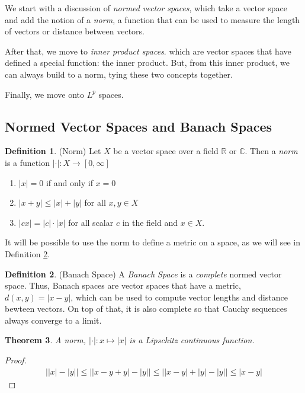 \documentclass[12pt]{article}
\theoremstyle{plain}
\newtheorem{thm}{Theorem}[section]
\theoremstyle{definition}
\newtheorem{defn}[thm]{Definition}
\theoremstyle{remark}
\begin{document}
We start with a discussion of \emph{normed vector spaces}, which take a
vector space and add the notion of a \emph{norm}, a function that can be
used to measure the length of vectors or distance between vectors.

After that, we move to \emph{inner product spaces}. which are vector
spaces that have defined a special function: the inner product. But,
from this inner product, we can always build to a norm, tying these two
concepts together.

Finally, we move onto $L^p$ spaces.

\subsection{Normed Vector Spaces and Banach Spaces}


\begin{defn}(Norm)
\label{defn.norm}
Let $X$ be a vector space over a field $\mathbb{R}$ or $\mathbb{C}$.
Then a \emph{norm} is a function
$\lvert\cdot\rvert:X\rightarrow[0,\infty]$
\begin{enumerate}
\item $\lvert x\rvert=0$ if and only if $x=0$
\item $\lvert x + y\rvert\leq \lvert x\rvert+\lvert y\rvert$ for all $x,y\in X$
\item $\lvert cx\rvert= |c|\cdot\lvert x\rvert$ for all scalar $c$ in the field and $x\in X$.
\end{enumerate}
It will be possible to use the norm to define a metric on a space, as we
will see in Definition \ref{defn.banach}.
\end{defn}

\begin{defn}(Banach Space)
\label{defn.banach}
A \emph{Banach Space} is a \emph{complete} normed vector space. Thus,
Banach spaces are vector spaces that have a metric, $d(x,y)=\lvert
x-y\rvert$, which can be used to compute vector lengths and distance
bewteen vectors. On top of that, it is also complete so that Cauchy
sequences always converge to a limit.
\end{defn}

\begin{thm}
A norm, $\lvert\cdot\rvert: x\mapsto \rvert x \lvert$ is a Lipschitz
continuous function.
\end{thm}
\begin{proof}
\begin{align*}
    \bigl\lvert \lvert x \rvert - \lvert y\rvert \bigr\rvert
    \leq
    \bigl\lvert \lvert x - y + y\rvert - \lvert y\rvert \bigr\rvert
    \leq
    \bigl\lvert \lvert x - y \rvert + \lvert y\rvert - \lvert y\rvert \bigr\rvert
    \leq
    \lvert x - y \rvert
\end{align*}
\end{proof}
\end{document}
